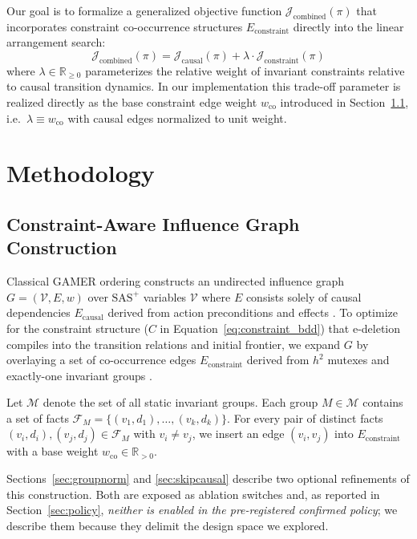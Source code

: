 \documentclass[twocolumn,10pt]{article}
\begin{document}
Our goal is to formalize a generalized objective function $\mathcal{J}_{\text{combined}}(\pi)$ that incorporates constraint co-occurrence structures $E_{\text{constraint}}$ directly into the linear arrangement search:
\begin{equation}
    \mathcal{J}_{\text{combined}}(\pi) = \mathcal{J}_{\text{causal}}(\pi) + \lambda \cdot \mathcal{J}_{\text{constraint}}(\pi)
    \label{eq:combined_problem}
\end{equation}
where $\lambda \in \mathbb{R}_{\ge 0}$ parameterizes the relative weight of invariant constraints relative to causal transition dynamics. In our implementation this trade-off parameter is realized directly as the base constraint edge weight $w_{\text{co}}$ introduced in Section~\ref{sec:influence}, i.e.\ $\lambda \equiv w_{\text{co}}$ with causal edges normalized to unit weight.

\section{Methodology}

\subsection{Constraint-Aware Influence Graph Construction}
\label{sec:influence}
Classical \textsf{GAMER} ordering constructs an undirected influence graph $G = (\mathcal{V}, E, w)$ over $\text{SAS}^+$ variables $\mathcal{V}$ where $E$ consists solely of causal dependencies $E_{\text{causal}}$ derived from action preconditions and effects \cite{edelkamp2008gamer, kissmann2014bdd}. To optimize for the constraint structure ($C$ in Equation~\ref{eq:constraint_bdd}) that e-deletion compiles into the transition relations and initial frontier, we expand $G$ by overlaying a set of co-occurrence edges $E_{\text{constraint}}$ derived from $h^2$ mutexes and exactly-one invariant groups \cite{torralba2013constrained}.

Let $\mathcal{M}$ denote the set of all static invariant groups. Each group $M \in \mathcal{M}$ contains a set of facts $\mathcal{F}_M = \{(v_1, d_1), \dots, (v_k, d_k)\}$. For every pair of distinct facts $(v_i, d_i), (v_j, d_j) \in \mathcal{F}_M$ with $v_i \neq v_j$, we insert an edge $(v_i, v_j)$ into $E_{\text{constraint}}$ with a base weight $w_{\text{co}} \in \mathbb{R}_{> 0}$.

Sections~\ref{sec:groupnorm} and \ref{sec:skipcausal} describe two optional refinements of this construction. Both are exposed as ablation switches and, as reported in Section~\ref{sec:policy}, \emph{neither is enabled in the pre-registered confirmed policy}; we describe them because they delimit the design space we explored.
\end{document}
